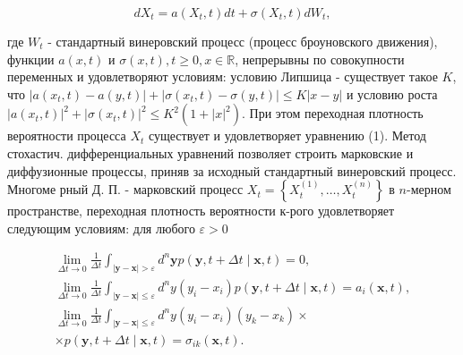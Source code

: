 \documentclass[10pt]{article}
\begin{document}
\[

d X_{t}=a\left(X_{t}, t\right) d t+\sigma\left(X_{t}, t\right) d W_{t},

\]



где $W_{t}$ - стандартный винеровский процесс (процесс броуновского движения), функции $a(x, t)$ и $\sigma(x, t), t \geqslant 0, x \in \mathbb{R}$, непрерывны по совокупности переменных и удовлетворяют условиям: условию Липшица - существует такое $K$, что $\left|a\left(x_{t}, t\right)-a(y, t)\right|+\left|\sigma\left(x_{t}, t\right)-\sigma(y, t)\right| \leqslant K|x-y|$ и условию роста $\left|a\left(x_{t}, t\right)\right|^{2}+\left|\sigma\left(x_{t}, t\right)\right|^{2} \leqslant K^{2}\left(1+|x|^{2}\right)$. При этом переходная плотность вероятности процесса $X_{t}$ существует и удовлетворяет уравнению (1). Метод стохастич. дифференциальных уравнений позволяет строить марковские и диффузионные процессы, приняв за исходный стандартный винеровский процесс. Многоме рный Д. П. - марковский процесс $X_{t}=\left\{X_{t}^{(1)}, \ldots, X_{t}^{(n)}\right\}$ в $n$-мерном пространстве, переходная плотность вероятности к-рого удовлетворяет следующим условиям: для любого $\varepsilon>0$



\[

\begin{gathered}

\lim _{\Delta t \rightarrow 0} \frac{1}{\Delta t} \int_{|\boldsymbol{y}-\boldsymbol{x}|>\varepsilon} d^{n} \boldsymbol{y} p(\boldsymbol{y}, t+\Delta t \mid \boldsymbol{x}, t)=0, \\

\lim _{\Delta t \rightarrow 0} \frac{1}{\Delta t} \int_{|\boldsymbol{y}-\boldsymbol{x}| \leqslant \varepsilon} d^{n} y\left(y_{i}-x_{i}\right) p(\boldsymbol{y}, t+\Delta t \mid \boldsymbol{x}, t)=a_{i}(\boldsymbol{x}, t), \\

\lim _{\Delta t \rightarrow 0} \frac{1}{\Delta t} \int_{|\boldsymbol{y}-\boldsymbol{x}| \leqslant \varepsilon} d^{n} y\left(y_{i}-x_{i}\right)\left(y_{k}-x_{k}\right) \times \\

\times p(\boldsymbol{y}, t+\Delta t \mid \boldsymbol{x}, t)=\sigma_{i k}(\boldsymbol{x}, t) .

\end{gathered}

\]
\end{document}
